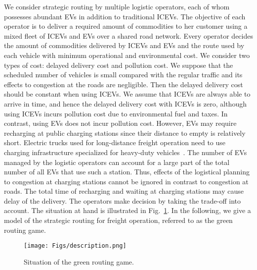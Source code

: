 \documentclass[letterpaper, 10 pt, conference]{ieeeconf}  %
\begin{document}
We consider strategic routing by multiple logistic operators, each of whom possesses abundant EVs in addition to traditional ICEVs.
The objective of each operator is to deliver a required amount of commodities to her customer using a mixed fleet of ICEVs and EVs over a shared road network.
Every operator decides the amount of commodities delivered by ICEVs and EVs and the route used by each vehicle with minimum operational and environmental cost.
We consider two types of cost: delayed delivery cost and pollution cost.
We suppose that the scheduled number of vehicles is small compared with the regular traffic and its effects to congestion at the roads are negligible.
Then the delayed delivery cost should be constant when using ICEVs.
We assume that ICEVs are always able to arrive in time, and hence the delayed delivery cost with ICEVs is zero, although using ICEVs incurs pollution cost due to environmental fuel and taxes.
In contrast, using EVs does not incur pollution cost.
However, EVs may require recharging at public charging stations since their distance to empty is relatively short.
Electric trucks used for long-distance freight operation need to use charging infrastructure specialized for heavy-duty vehicles~\cite{Al2021Charging}.
The number of EVs managed by the logistic operators can account for a large part of the total number of all EVs that use such a station.
Thus, effects of the logistical planning to congestion at charging stations cannot be ignored in contrast to congestion at roads.
The total time of recharging and waiting at charging stations may cause delay of the delivery.
The operators make decision by taking the trade-off into account.
The situation at hand is illustrated in Fig.~\ref{fig:des}.
In the following, we give a model of the strategic routing for freight operation, referred to as the green routing game.
\fi

\begin{figure}[t]
  \centering
  \texttt{[image: Figs/description.png]}
  \caption{
  Situation of the green routing game.
  }
  \label{fig:des}
\end{figure}
\end{document}
